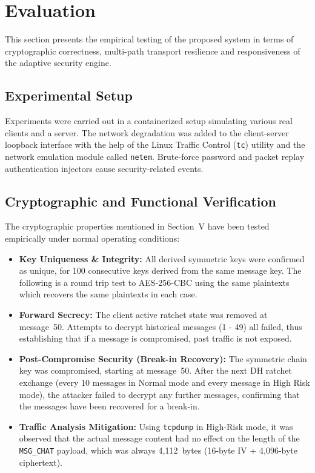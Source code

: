 \documentclass[conference]{IEEEtran}
\begin{document}
\section{Evaluation}
\label{sec:evaluation}

This section presents the empirical testing of the proposed system in terms of cryptographic correctness, multi-path transport resilience and responsiveness of the adaptive security engine.

\subsection{Experimental Setup}

Experiments were carried out in a containerized setup simulating various real clients and a server. The network degradation was added to the client-server loopback interface with the help of the Linux Traffic Control (\texttt{tc}) utility and the network emulation module called \texttt{netem}. Brute-force password and packet replay authentication injectors cause security-related events.

\subsection{Cryptographic and Functional Verification}

The cryptographic properties mentioned in Section~V have been tested empirically under normal operating conditions:
\begin{itemize}
    \item \textbf{Key Uniqueness \& Integrity:} All derived symmetric keys were confirmed as unique, for 100 consecutive keys derived from the same message key. The following is a round trip test to AES-256-CBC using the same plaintexts which recovers the same plaintexts in each case.
    \item \textbf{Forward Secrecy:} The client active ratchet state was removed at message~50. Attempts to decrypt historical messages (1 - 49) all failed, thus establishing that if a message is compromised, past traffic is not exposed.
    \item \textbf{Post-Compromise Security (Break-in Recovery):} The symmetric chain key was compromised, starting at message~50. After the next DH ratchet exchange (every 10 messages in Normal mode and every message in High Risk mode), the attacker failed to decrypt any further messages, confirming that the messages have been recovered for a break-in.
    \item \textbf{Traffic Analysis Mitigation:} Using \texttt{tcpdump} in High-Risk mode, it was observed that the actual message content had no effect on the length of the \texttt{MSG\_CHAT} payload, which was always 4,112~bytes (16-byte IV + 4,096-byte ciphertext).
\end{itemize}
\end{document}
